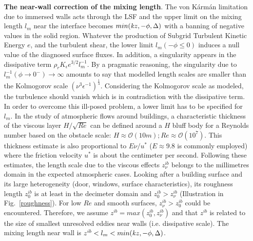 {\bf The near-wall correction of the mixing length}. The von K\'arm\'an limitation due to immersed walls acts through the LSF and the upper limit on the mixing length $l_m$ near the interface becomes $min({\it k}z,-\phi, \Delta)$ with a banning of negative values in the solid region. Whatever the production of Subgrid Turbulent Kinetic Energy $e$, and the turbulent shear, the lower limit $l_m(-\phi \le 0)$ induces a null value of the diagnosed surface fluxes. In addition, a singularity appears in the dissipative term $\rho_r K_\epsilon e^{3/2}l_m^{-1}$. By a pragmatic reasoning, the singularity due to $l_m^{-1}(\phi \rightarrow 0^{-}) \rightarrow \infty$ amounts to say that modelled length scales are smaller than the Kolmogorov scale $(\nu^{3}\epsilon^{-1})^{\frac{1}{4}}$. Considering the Kolmogorov scale as modeled, the turbulence should vanish which is in contradiction with the dissipative term. In order to overcome this ill-posed problem, a lower limit has to be specified for $l_m$. In the study of atmospheric flows around buildings, a characteristic thickness of the viscous layer $H/\sqrt{Re}$ can be defined around a $H$ bluff body for a Reynolds number based on the obstacle scale: $H \approx {\mathcal O}(10m); Re \approx {\mathcal O}(10^7)$. This thickness estimate is also proportional to $E\nu/u^*$ ($E \approx 9.8$ is commonly employed) where the friction velocity $u^*$ is about the centimeter per second. Following these estimates, the length scale due to the viscous effects $z_\nu^{ib}$ belongs to the millimetres domain in the expected atmospheric cases. Looking after a building surface and its large heterogeneity (door, windows, surface characteristics), its roughness length $z_0^{ib}$ is at least in the decimeter domain and $z_0^{ib} > z_\nu^{ib}$ (Illustration in Fig.~\ref{roughness}). For low $Re$ and smooth surfaces, $z_\nu^{ib}>z_0^{ib}$ could be encountered. Therefore, we assume $z^{ib}=max(z_0^{ib},z_\nu^{ib})$ and that $z^{ib}$ is related to the size of smallest unresolved eddies near walls (i.e. dissipative scale). The mixing length near wall is $z^{ib}<l_m<min({\it k}z,-\phi,\Delta)$. \\

